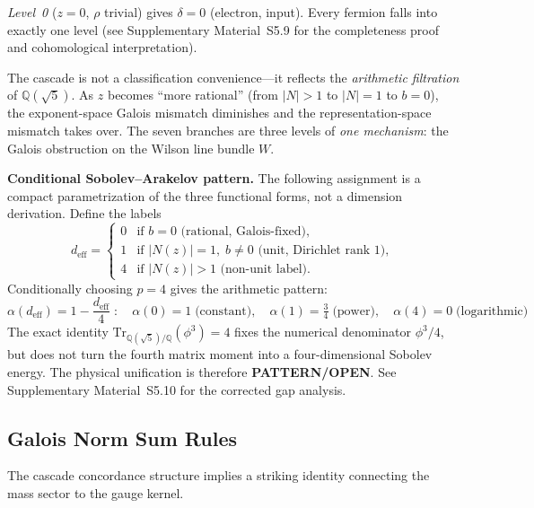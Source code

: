 \documentclass[12pt,a4paper]{article}
\theoremstyle{definition}
\begin{document}
\smallskip

\noindent\emph{Level~0} ($z = 0$, $\rho$ trivial) gives $\delta = 0$ (electron, input).  Every fermion falls into exactly one level (see Supplementary Material~S5.9 for the completeness proof and cohomological interpretation).

The cascade is not a classification convenience---it reflects the \emph{arithmetic filtration} of $\mathbb{Q}(\sqrt{5})$.  As $z$ becomes ``more rational'' (from $|N| > 1$ to $|N| = 1$ to $b = 0$), the exponent-space Galois mismatch diminishes and the representation-space mismatch takes over.  The seven branches are three levels of \emph{one mechanism}: the Galois obstruction on the Wilson line bundle $W$.

\textbf{Conditional Sobolev--Arakelov pattern.}  The following assignment is a compact parametrization of the three functional forms, not a dimension derivation.  Define the labels
\begin{equation}
d_{\text{eff}} =
\begin{cases}
0 & \text{if } b = 0 \text{ (rational, Galois-fixed)}, \\
1 & \text{if } |N(z)| = 1,\; b \neq 0 \text{ (unit, Dirichlet rank 1)}, \\
4 & \text{if } |N(z)| > 1 \text{ (non-unit label)}.
\end{cases}
\label{eq:d_eff}
\end{equation}
Conditionally choosing $p=4$ gives the arithmetic pattern:
\begin{equation}
\boxed{\alpha(d_{\text{eff}}) = 1 - \frac{d_{\text{eff}}}{4} \;:\quad
\alpha(0) = 1\;\text{(constant)},\quad
\alpha(1) = \tfrac{3}{4}\;\text{(power)},\quad
\alpha(4) = 0\;\text{(logarithmic)}}
\label{eq:morrey_alpha}
\end{equation}
The exact identity $\mathrm{Tr}_{\mathbb Q(\sqrt5)/\mathbb Q}(\phi^3)=4$ fixes the numerical denominator $\phi^3/4$, but does not turn the fourth matrix moment into a four-dimensional Sobolev energy.  The physical unification is therefore \textbf{PATTERN/OPEN}.  See Supplementary Material~S5.10 for the corrected gap analysis.

\subsection{Galois Norm Sum Rules}
\label{sec:norm_sum}

The cascade concordance structure implies a striking identity connecting the mass sector to the gauge kernel.
\end{document}
